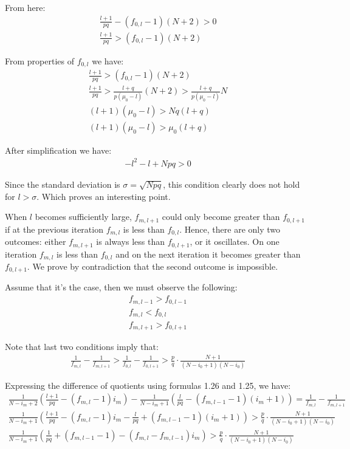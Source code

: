 \documentclass[11pt,draft]{article}
\begin{document}
From here:
\begin{align}
\frac{l+1}{pq} - (f_{0,l} - 1)(N+2) > 0 \\
\frac{l+1}{pq} > (f_{0,l} - 1)(N+2)
\end{align}

From properties of $f_{0,l}$ we have:
\begin{align}
\frac{l+1}{pq} > (f_{0,l} - 1)(N+2) \\
\frac{l+1}{pq} > \frac{l + q}{p(\mu_0 - l)}(N+2) >   \frac{l + q}{p(\mu_0 - l)}N \\
(l+1)(\mu_0 - l) > Nq(l+q) \\
(l+1)(\mu_0 - l) > \mu_0(l+q)
\end{align}

After simplification we have:
\begin{align}
-l^2 - l +Npq > 0
\end{align}

Since the standard deviation is $\sigma = \sqrt{Npq}$, this condition clearly does not hold for $l>\sigma$.  Which proves an interesting point.

When $l$ becomes sufficiently large,  $f_{m,l+1}$ could only become greater than $f_{0,l+1}$ if at the previous iteration $f_{m,l}$ is less than $f_{0,l}$.  Hence, there are only two outcomes:
either  $f_{m,l+1}$ is always less than  $f_{0,l+1}$, or it oscillates.  On one iteration  $f_{m,l}$ is less than  $f_{0,l}$ and on the next iteration it becomes greater than  $f_{0,l+1}$. 
We prove by contradiction that the second outcome is impossible.

Assume that it's the case, then we must observe the following:
\begin{align}
f_{m,l-1} > f_{0,l-1} \\
f_{m,l} < f_{0,l} \\
f_{m,l+1} >  f_{0,l+1}
\end{align}

Note that last two conditions imply that:
\begin{align}
\frac{1}{f_{m,l}} - \frac{1}{f_{m,l+1}} > \frac{1}{f_{0,l}} - \frac{1}{f_{0,l+1}} >  \frac{p}{q}  \cdot \frac{N+1}{(N-i_0+1)(N-i_0)} 
\end{align}

Expressing the difference of quotients using  formulas  1.26 and 1.25, we have:
\begin{align}
 \frac{1}{N- i_m + 2}\left (\frac{l+1}{pq} - (f_{m,l} - 1)i_m \right ) -  \frac{1}{N- i_m + 1}\left (\frac{l}{pq} - (f_{m,l-1} - 1)(i_m+1) \right )  = \frac{1}{f_{m,l}} - \frac{1}{f_{m,l+1}}   \\
 \frac{1}{N- i_m + 1}\left ( \frac{l+1}{pq} - (f_{m,l} - 1)i_m  -  \frac{l}{pq} + (f_{m,l-1} - 1)(i_m+1) \right )>  \frac{p}{q}  \cdot \frac{N+1}{(N-i_0+1)(N-i_0)} \\
 \frac{1}{N- i_m + 1}\left ( \frac{1}{pq} + (f_{m,l-1} - 1) - (f_{m,l} -  f_{m,l-1})i_m  \right )> \frac{p}{q}  \cdot \frac{N+1}{(N-i_0+1)(N-i_0)} 
\end{align}
\end{document}
